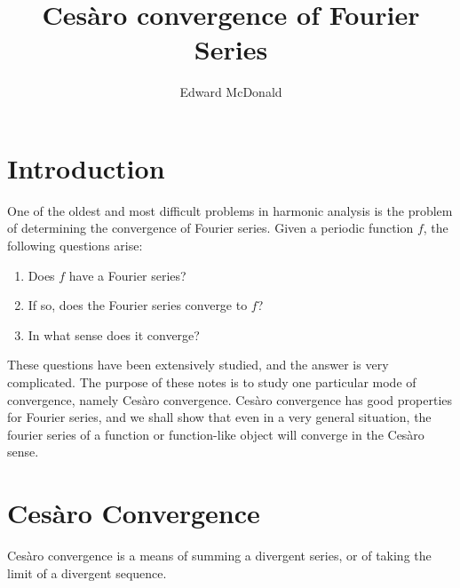 \documentclass{owmaths}
\begin{document}
\subject{Harmonic Analysis}
\author{Edward McDonald}
\title{Ces\`aro convergence of Fourier Series}


\setlength\parindent{0pt}

\newcommand{\clim}{\operatorname{c-lim}\;}
\newcommand{\Circ}{\mathbb{T}}
\newcommand{\ha}{\boldsymbol{m}}

\section{Introduction}
One of the oldest and most difficult problems in harmonic analysis is
the problem of determining the convergence of Fourier series. Given a periodic
function $f$, the following questions arise:
\begin{enumerate}
    \item{} Does $f$ have a Fourier series?
    \item{} If so, does the Fourier series converge to $f$?
    \item{} In what sense does it converge?
\end{enumerate}
These questions have been extensively studied, and the answer is very complicated.
The purpose of these notes is to study one particular mode of
convergence, namely Ces\`aro convergence. Ces\`aro convergence has good properties 
for Fourier series, and we shall show that
even in a very general situation, the fourier series of a function
or function-like object will converge in the Ces\`aro sense.

\section{Ces\`aro Convergence}
Ces\`aro convergence is a means of summing a divergent series, or 
of taking the limit of a divergent sequence. 
\end{document}
